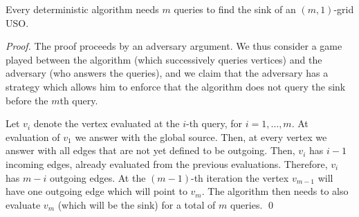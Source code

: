 \documentclass[runningheads,a4paper]{llncs}
\begin{document}
\begin{lemma}\label{lem:kx1}
Every deterministic algorithm needs $m$ queries to find the sink of an $(m,1)$-grid USO.
\end{lemma}
\begin{proof}
    The proof proceeds by an adversary argument.
    We thus consider a game played between the algorithm (which successively
    queries vertices) and the adversary (who answers the queries),
    and we claim that the adversary has a strategy which allows him to enforce
    that the algorithm does not query the sink before the $m$th query.

Let $v_i$ denote the vertex evaluated at the $i$-th query, for $i=1,\ldots, m$. At evaluation of $v_1$ we answer with the global source. Then, at every vertex
we answer with all edges that are not yet defined to be outgoing. Then, $v_i$ has $i-1$ incoming edges, already evaluated from the previous evaluations. 
Therefore, $v_i$ has $m-i$ outgoing edges. At the $(m-1)$-th iteration the vertex $v_{m-1}$ will have one outgoing edge which will point to $v_m$.
The algorithm then needs to also evaluate $v_m$ (which will be the sink) for a total of $m$ queries. \qed 
\end{proof}
\end{document}
